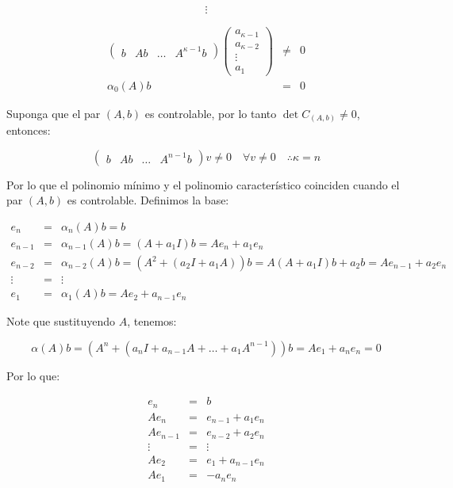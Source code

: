 \begin{equation}
\vdots \nonumber
\end{equation}

\begin{eqnarray}
\begin{pmatrix}
b & Ab & \dots & A^{\kappa - 1} b
\end{pmatrix}
\begin{pmatrix}
a_{\kappa - 1} \\
a_{\kappa - 2} \\
\vdots \\
a_{1}
\end{pmatrix} & \ne & 0 \nonumber \\
\alpha_0(A) b & = & 0 \nonumber
\end{eqnarray}

Suponga que el par $(A,b)$ es controlable, por lo tanto $\det{C_{(A,b)}} \ne 0$, entonces:

\begin{equation}
\begin{pmatrix}
b & A b & \dots & A^{n-1} b
\end{pmatrix} v \ne 0 \quad \forall v \ne 0 \quad \therefore \kappa = n
\end{equation}

Por lo que el polinomio mínimo y el polinomio característico coinciden cuando el par $(A,b)$ es controlable. Definimos la base:

\begin{eqnarray}
e_n & = & \alpha_n(A) b = b \nonumber \\
e_{n-1} & = & \alpha_{n-1}(A) b = (A + a_1I) b = A e_n + a_1 e_n \nonumber \\
e_{n-2} & = & \alpha_{n-2}(A) b = (A^2 + (a_2I + a_1A)) b = A(A+a_1I) b + a_2 b = A e_{n-1} + a_2 e_n \nonumber \\
\vdots & = & \vdots \nonumber \\
e_1 & = & \alpha_1(A) b = A e_2 + a_{n-1} e_n
\end{eqnarray}

Note que sustituyendo $A$, tenemos:

\begin{equation}
\alpha(A) b = (A^n + (a_nI + a_{n-1}A + \dots + a_1 A^{n-1})) b = A e_1 + a_n e_n = 0
\end{equation}

Por lo que:

\begin{eqnarray}
e_n & = & b \nonumber \\
A e_{n} & = & e_{n-1} + a_1 e_n \nonumber \\
A e_{n-1} & = & e_{n-2} + a_2 e_n \nonumber \\
\vdots & = & \vdots \nonumber \\
A e_2 & = & e_1 + a_{n-1} e_n \nonumber \\
A e_1 & = & - a_{n} e_n
\end{eqnarray}

